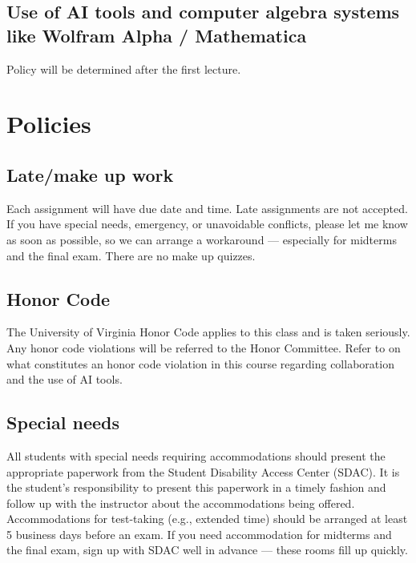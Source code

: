 \documentclass[oneside,11pt]{amsart}
\begin{document}
\subsection{Use of AI tools and computer algebra systems like Wolfram Alpha / Mathematica} 
\label{AI_tools}

Policy will be determined after the first lecture.


\section{Policies}

\subsection{Late/make up work}
Each assignment will have due date and time. Late assignments are not accepted. If you have special needs, emergency, or unavoidable conflicts, please let me know as soon as possible, so we can arrange a workaround --- especially for midterms and the final exam. There are no make up quizzes.

\subsection{Honor Code}
The University of Virginia Honor Code applies to this class and is taken seriously. Any honor code violations will be referred to the Honor Committee. Refer to  on what constitutes an honor code violation in this course regarding collaboration and the use of AI tools.

\subsection{Special needs}

All students with special needs requiring accommodations should present the appropriate paperwork from the Student Disability Access Center (SDAC). It is the student's responsibility to present this paperwork in a timely fashion and follow up with the instructor about the accommodations being offered. Accommodations for test-taking (e.g., extended time) should be arranged at least 5 business days before an exam. 
If you need accommodation for midterms and the final exam, sign up with SDAC well in advance --- these rooms fill up quickly.
\end{document}
